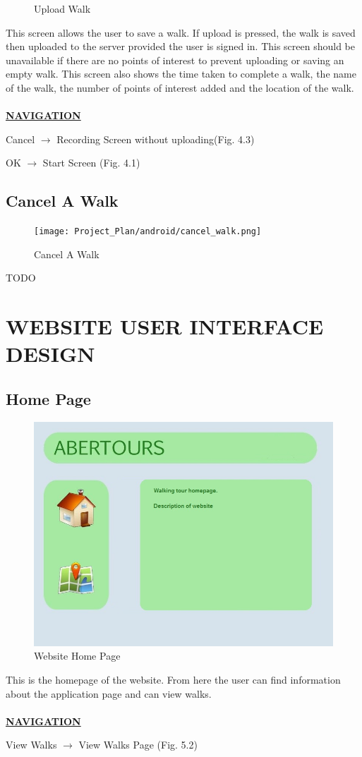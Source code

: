\documentclass[12pt]{article}
\begin{document}
{\begin{figure}[htp]
\caption{Upload Walk}
\label{Upload Walk}
\end{figure}
\par{This screen allows the user to save a walk. If upload is pressed, the walk is saved then uploaded to the server provided the user is signed in. This screen should be unavailable if there are no points of interest to prevent uploading or saving an empty walk. This screen also shows the time taken to complete a walk, the name of the walk, the number of points of interest added and the location of the walk. \\ \\}
\textbf{\uline{NAVIGATION}}
\par{Cancel $\rightarrow$ Recording Screen without uploading(Fig. 4.3)}
\par{OK $\rightarrow$ Start Screen (Fig. 4.1)}
\subsection{Cancel A Walk}
\begin{figure}[htp]
\centering
\texttt{[image: Project\_Plan/android/cancel\_walk.png]}
\caption{Cancel A Walk}
\label{Cancel A Walk}
\end{figure}
TODO
\newpage
\section{WEBSITE USER INTERFACE DESIGN}
\subsection{Home Page}

\begin{figure}[htp]
\centering

\includegraphics[scale=0.60]{Project_Plan/Web/homepage_01.jpg}
\caption{Website Home Page}
\label{Website Home Page}
\end{figure}
\par{This is the homepage of the website. From here the user can find information about the application page and can view walks. \\ \\}
\textbf{\uline{NAVIGATION}}
\par{View Walks $\rightarrow$ View Walks Page (Fig. 5.2)}
\clearpage
}
\end{document}
